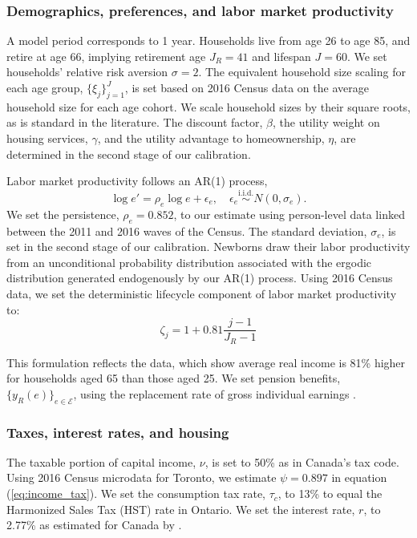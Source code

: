 \documentclass[parskip=full]{article}
\begin{document}
\subsubsection{Demographics, preferences, and labor market productivity}
A model period corresponds to 1 year. Households live from age 26 to age 85, and retire at age 66, implying retirement age $J_{R}=41$ and lifespan $J=60$. We set households' relative risk aversion $\sigma=2$. The equivalent household size scaling for each age group, $\{\xi_{j}\}_{j=1}^{J}$, is set based on 2016 Census data on the average household size for each age cohort. We scale household sizes by their square roots, as is standard in the literature. The discount factor, $\beta$, the utility weight on housing services, $\gamma$, and the utility advantage to homeownership, $\eta$, are determined in the second stage of our calibration.

Labor market productivity follows an AR(1) process,
\begin{equation*}
  \log e' = \rho_{e} \log e + \epsilon_{e},\quad \epsilon_{e}\overset{\mathrm{i.i.d.}} \sim N(0,\sigma_{e}).
\end{equation*}
We set the persistence, $\rho_{e}=0.852$, to our estimate using person-level data linked between the 2011 and 2016 waves of the Census. The standard deviation, $\sigma_{e}$, is set in the second stage of our calibration. Newborns draw their labor productivity from an unconditional probability distribution associated with the ergodic distribution generated endogenously by our AR(1) process. Using 2016 Census data, we set the deterministic lifecycle component of labor market productivity to: 
\begin{equation*}
\zeta_j = 1+0.81 \frac{j-1}{J_{R}-1}
\end{equation*}

\noindent This formulation reflects the data, which show average real income is 81\% higher for households aged 65 than those aged 25. We set pension benefits, $\{y_{R}(e)\}_{e\in \mathcal{E}}$, using the replacement rate of gross individual earnings \citep{OECD-pension}.

\subsubsection{Taxes, interest rates, and housing}

The taxable portion of capital income, $\nu$, is set to 50\% as in Canada's tax code. Using 2016 Census microdata for Toronto, we estimate $\psi=0.897$ in equation (\ref{eq:income_tax}). We set the consumption tax rate, $\tau_{c}$, to 13\% to equal the Harmonized Sales Tax (HST) rate in Ontario. We set the interest rate, $r$, to 2.77\% as estimated for Canada by \citet{bruneau-etal-2018}. 
\end{document}
